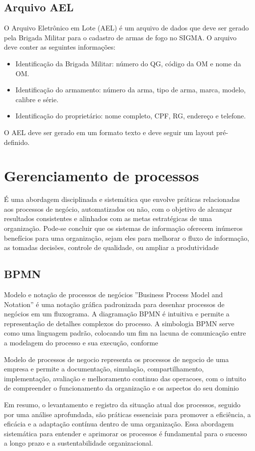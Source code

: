 \subsection{Arquivo AEL}
O Arquivo Eletrônico em Lote (AEL) é um arquivo de dados que deve ser gerado pela Brigada Militar para o cadastro de armas de fogo no SIGMA. O arquivo deve conter as seguintes informações:
\begin{itemize}
    \item Identificação da Brigada Militar: número do QG, código da OM e nome da OM.
    \item Identificação do armamento: número da arma, tipo de arma, marca, modelo, calibre e série.
    \item Identificação do proprietário: nome completo, CPF, RG, endereço e telefone.
\end{itemize}\cite{ExércitoBrasileiro}

O AEL deve ser gerado em um formato texto e deve seguir um layout pré-definido.\cite{ebInstrucaoAdministrativa} 

\section{Gerenciamento de processos}
É uma abordagem disciplinada e sistemática que envolve práticas relacionadas aos processos de negócio, automatizados ou não, com o objetivo de alcançar resultados consistentes e alinhados com as metas estratégicas de uma organização. Pode-se concluir que os sistemas de informação oferecem inúmeros benefícios para uma organização, sejam eles para melhorar o fluxo de informação, as tomadas decisões, controle de qualidade, ou ampliar a produtividade\cite{davila2008inovaccao}

\subsection{BPMN}
Modelo e notação de processos de negócios ''Business Process Model and Notation'' é uma notação gráfica padronizada para desenhar processos de negócios em um fluxograma. A diagramação BPMN é intuitiva e permite a representação de detalhes complexos do processo. A simbologia BPMN serve como uma linguagem padrão, colocando um fim na lacuna de comunicação entre a modelagem do processo e sua execução, conforme 
\begin{citacao}
	\cite{bitencourt2016elicitaccao} 
	Modelo de processos de negocio representa os processos de negocio de uma empresa e permite a documentação, simulação, compartilhamento, implementação, avaliação e melhoramento continuo das operacoes, com o intuito de compreender o funcionamento da organização e os aspectos do seu dominio
	
\end{citacao}
Em resumo, o levantamento e registro da situação atual dos processos, seguido por uma análise aprofundada, são práticas essenciais para promover a eficiência, a eficácia e a adaptação contínua dentro de uma organização. Essa abordagem sistemática para entender e aprimorar os processos é fundamental para o sucesso a longo prazo e a sustentabilidade organizacional.

